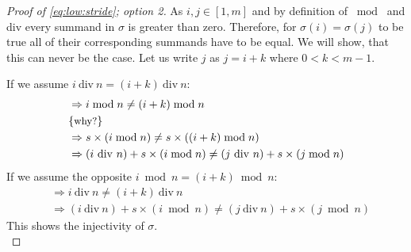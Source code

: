 \begin{proof}[Proof of \autoref{eq:low:stride}; option 2]
%
  As $i,j\in [1,m]$ and by definition of $\bmod{}$ and div every summand in $\sigma$ is greater than zero.
  Therefore, for $\sigma(i) = \sigma(j)$ to be true all of their corresponding summands have to be equal.
  We will show, that this can never be the case.
  Let us write $j$ as $j=i+k$ where $0<k<m-1$.

  If we assume $i\ \text{div}\ n = (i+k)\ \text{div}\ n$:
  \begin{align*}
    &\Rightarrow i\bmod{n} \neq (i+k)\bmod{n}\\
    &\comment{why?}\\
    &\Rightarrow s \times (i\bmod{n}) \neq s \times ((i+k)\bmod{n})\\
    &\Rightarrow (i\ \text{div}\ n) + s\times (i\bmod{n}) \neq (j\ \text{div}\ n) + s\times (j\bmod{n})
  \end{align*}
  If we assume the opposite $i\bmod{n} = (i+k)\bmod{n}$:
  \begin{align*}
    &\Rightarrow i\ \text{div}\ n \neq (i+k)\ \text{div}\ n\\
    &\Rightarrow (i\ \text{div}\ n) + s\times (i\bmod{n}) \neq (j\ \text{div}\ n) + s\times (j\bmod{n})
  \end{align*}
  This shows the injectivity of $\sigma$.\\[1em]


\end{proof}
